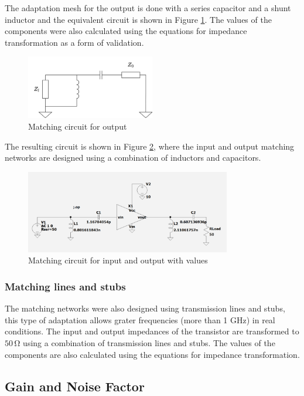 The adaptation mesh for the output is done with a series capacitor and a shunt inductor and the equivalent circuit is shown in Figure \ref{fig:MatchingCircuit-output}. The values of the components were also calculated using the equations for impedance transformation as a form of validation.

\begin{figure}[H]
    \centering
    \includegraphics[width=0.5\textwidth]{Images/Ouput-matching-circuit.png}
    \caption{Matching circuit for output}
    \label{fig:MatchingCircuit-output} 
\end{figure}

The resulting circuit is shown in Figure \ref{fig:MatchingCircuit}, where the input and output matching networks are designed using a combination of inductors and capacitors.

\begin{figure}[H]
    \centering
    \includegraphics[width=0.8\textwidth]{Images/LC_matching-circuit.png}
    \caption{Matching circuit for input and output with values}
    \label{fig:MatchingCircuit}
\end{figure}

\subsubsection{Matching lines and stubs}
The matching networks were also designed using transmission lines and stubs, this type of adaptation allows grater frequencies (more than 1 \si{\giga \hertz}) in real conditions. The input and output impedances of the transistor are transformed to $50\,\si{\ohm}$ using a combination of transmission lines and stubs. The values of the components are also calculated using the equations for impedance transformation.

\subsection{Gain and Noise Factor}
